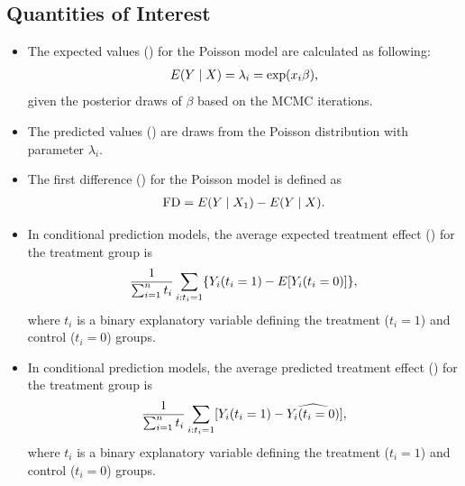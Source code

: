 \documentclass[letterpaper,10pt,english]{sphinxmanual}
\begin{document}
\subsection{Quantities of Interest}
\label{vignette:id105}\begin{itemize}
\item {} 
The expected values () for the Poisson model are calculated
as following:
\begin{gather}
\begin{split}\begin{aligned}
E(Y\mid X) = \lambda_i = \exp(x_i \beta),\end{aligned}\end{split}\notag
\end{gather}
given the posterior draws of \(\beta\) based on the MCMC
iterations.

\item {} 
The predicted values () are draws from the Poisson
distribution with parameter \(\lambda_i\).

\item {} 
The first difference () for the Poisson model is defined as
\begin{gather}
\begin{split}\begin{aligned}
\text{FD}=E(Y\mid X_{1})-E(Y\mid X).\end{aligned}\end{split}\notag
\end{gather}
\item {} 
In conditional prediction models, the average expected treatment
effect () for the treatment group is
\begin{gather}
\begin{split}\begin{aligned}
\frac{1}{\sum_{i=1}^n t_{i}}\sum_{i:t_{i}=1}\{Y_{i}(t_{i}=1)-E[Y_{i}(t_{i}=0)]\},\end{aligned}\end{split}\notag
\end{gather}
where \(t_{i}\) is a binary explanatory variable defining the
treatment (\(t_{i}=1\)) and control (\(t_{i}=0\)) groups.

\item {} 
In conditional prediction models, the average predicted treatment
effect () for the treatment group is
\begin{gather}
\begin{split}\begin{aligned}
\frac{1}{\sum_{i=1}^n t_{i}}\sum_{i:t_{i}=1}[Y_{i}(t_{i}=1)-\widehat{Y_{i}(t_{i}=0)}],\end{aligned}\end{split}\notag
\end{gather}
where \(t_{i}\) is a binary explanatory variable defining the
treatment (\(t_{i}=1\)) and control (\(t_{i}=0\)) groups.

\end{itemize}
\end{document}
